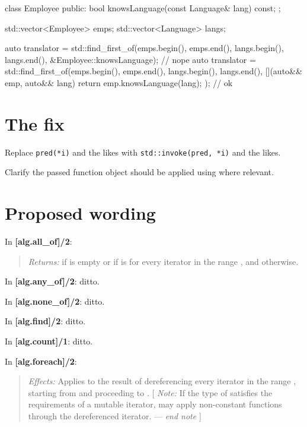 \documentclass{wg21}
\newcommand{\cc}[1]{\texttt{#1}}
\begin{document}
\begin{cpp}
  class Employee
  {
  public:
      bool knowsLanguage(const Language& lang) const;
  };

  std::vector<Employee> emps;
  std::vector<Language> langs;

  auto translator = std::find_first_of(emps.begin(), emps.end(),
          langs.begin(), langs.end(),
          &Employee::knowsLanguage);                            // nope
  auto translator = std::find_first_of(emps.begin(), emps.end(),
          langs.begin(), langs.end(),
          [](auto&& emp, auto&& lang) { return emp.knowsLanguage(lang); });
                                                                // ok
\end{cpp}

\section{The fix}

Replace \cc{pred(*i)} and the likes with \cc{std::invoke(pred, *i)}
and the likes.

Clarify the passed function object should be applied using 
where relevant.

\section{Proposed wording}

In \textbf{[alg.all_of]/2}:
\begin{quote}
  \emph{Returns:}  if \tcode{[first, last)} is empty or if
    is
   for every iterator  in the range \tcode{[first, last)},
  and  otherwise.
\end{quote}

In \textbf{[alg.any_of]/2}: ditto.

In \textbf{[alg.none_of]/2}: ditto.

In \textbf{[alg.find]/2}: ditto.

In \textbf{[alg.count]/1}: ditto.

In \textbf{[alg.foreach]/2}:
\begin{quote}
  \emph{Effects:} Applies   to the
  result of dereferencing every iterator in the range \tcode{[first, last)},
  starting from  and proceeding to .
  [ \emph{Note:} If the type of  satisfies the requirements of a
  mutable iterator,  may apply non-constant functions through the
  dereferenced iterator. --- \emph{end note} ]
\end{quote}
\end{document}
